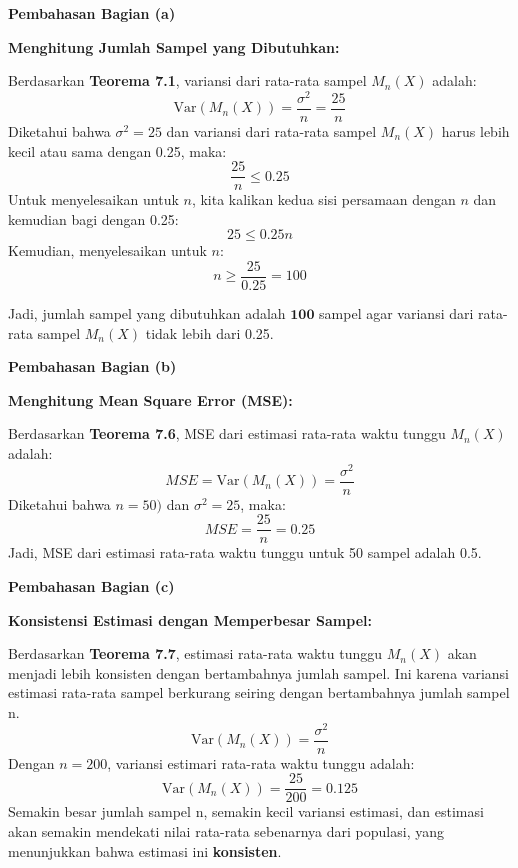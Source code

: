\documentclass{article}
\begin{document}
\textbf{Pembahasan Bagian (a)}

\textbf{Menghitung Jumlah Sampel yang Dibutuhkan:}

Berdasarkan \textbf{Teorema 7.1}, variansi dari rata-rata sampel \( M_n(X) \) adalah:
\[
\text{Var}(M_n(X)) = \frac{\sigma^2}{n} = \frac{25}{n}
\]
Diketahui bahwa \( \sigma^2 = 25 \) dan variansi dari rata-rata sampel \( M_n(X) \) harus lebih kecil atau sama dengan 0.25, maka:
\[
\frac{25}{n} \leq 0.25
\]
Untuk menyelesaikan untuk \( n \), kita kalikan kedua sisi persamaan dengan \( n \) dan kemudian bagi dengan 0.25:
\[
25 \leq 0.25n
\]
Kemudian, menyelesaikan untuk \( n \):
\[
n \geq \frac{25}{0.25} = 100
\]

Jadi, jumlah sampel yang dibutuhkan adalah \( \mathbf{100} \) sampel agar variansi dari rata-rata sampel \( M_n(X) \) tidak lebih dari 0.25.

\textbf{Pembahasan Bagian (b)}

\textbf{Menghitung Mean Square Error (MSE):}

Berdasarkan \textbf{Teorema 7.6}, MSE dari estimasi rata-rata waktu tunggu \( M_n(X) \) adalah:
\[
MSE =\text{Var}(M_n(X)) = \frac{\sigma^2}{n}
\]
Diketahui bahwa \(n = 50)\) dan \( \sigma^2 = 25 \), maka:
\[
MSE = \frac{25}{n} = 0.25
\]
Jadi, MSE dari estimasi rata-rata waktu tunggu untuk 50 sampel adalah 0.5.

\textbf{Pembahasan Bagian (c)}

\textbf{Konsistensi Estimasi dengan Memperbesar Sampel:}

Berdasarkan \textbf{Teorema 7.7}, estimasi rata-rata waktu tunggu \( M_n(X) \) akan menjadi lebih konsisten dengan bertambahnya jumlah sampel. Ini karena variansi estimasi rata-rata sampel berkurang seiring dengan bertambahnya jumlah sampel n.
\[
\text{Var}(M_n(X)) = \frac{\sigma^2}{n}
\]
Dengan \( n = 200 \), variansi estimari rata-rata waktu tunggu adalah:
\[
\text{Var}(M_n(X)) = \frac{25}{200} = 0.125
\]
Semakin besar jumlah sampel n, semakin kecil variansi estimasi, dan estimasi akan semakin mendekati nilai rata-rata sebenarnya dari populasi, yang menunjukkan bahwa estimasi ini \textbf{konsisten}.
\end{document}
